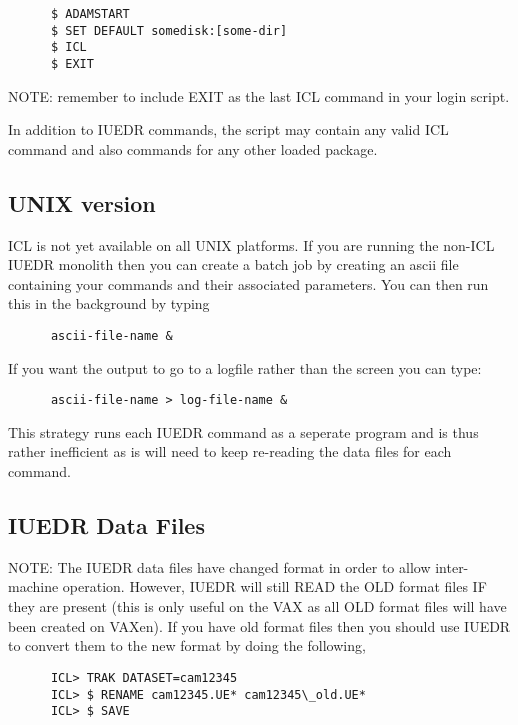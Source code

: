 \begin{verbatim}
      $ ADAMSTART
      $ SET DEFAULT somedisk:[some-dir]
      $ ICL
      $ EXIT
\end{verbatim}

NOTE: remember to include EXIT as the last ICL command in your login
script.

In addition to IUEDR commands, the script may contain any valid ICL
command and also commands for any other loaded package.

\subsection{UNIX version}

ICL is not yet available on all UNIX platforms. If you are running the
non-ICL IUEDR monolith then you can create a batch job by creating an 
ascii file containing your commands and their associated parameters.
You can then run this in the background by typing

\begin{verbatim}
      ascii-file-name &
\end{verbatim}

If you want the output to go to a logfile rather than the screen you
can type: 

\begin{verbatim}
      ascii-file-name > log-file-name &
\end{verbatim}

This strategy runs each IUEDR command as a seperate program and is
thus  rather inefficient as is will need to keep re-reading the data
files for each command.

\subsection {IUEDR Data Files}

NOTE: The IUEDR data files have changed format in order to allow 
inter-machine operation. However, IUEDR will still READ the OLD format
files IF they are present (this is only useful on the VAX as all OLD
format files will have been created on VAXen). If you have old format
files then you should use IUEDR to convert them to the new format by
doing the following, 

\begin{verbatim}
      ICL> TRAK DATASET=cam12345
      ICL> $ RENAME cam12345.UE* cam12345\_old.UE*
      ICL> $ SAVE
\end{verbatim}

